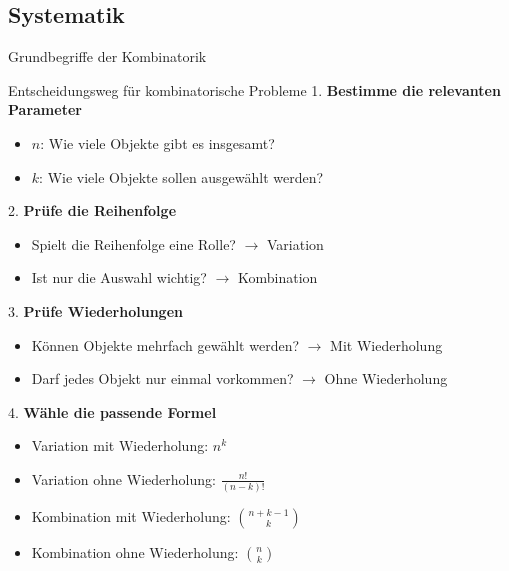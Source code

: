\subsection{Systematik}
\begin{concept}{Grundbegriffe der Kombinatorik}
\begin{center}
\end{center}
\end{concept}

\begin{KR}{Entscheidungsweg für kombinatorische Probleme}
1. \textbf{Bestimme die relevanten Parameter}
   \begin{itemize}
   \item $n$: Wie viele Objekte gibt es insgesamt?
   \item $k$: Wie viele Objekte sollen ausgewählt werden?
   \end{itemize}

2. \textbf{Prüfe die Reihenfolge}
   \begin{itemize}
   \item Spielt die Reihenfolge eine Rolle? $\rightarrow$ Variation
   \item Ist nur die Auswahl wichtig? $\rightarrow$ Kombination
   \end{itemize}

3. \textbf{Prüfe Wiederholungen}
   \begin{itemize}
   \item Können Objekte mehrfach gewählt werden? $\rightarrow$ Mit Wiederholung
   \item Darf jedes Objekt nur einmal vorkommen? $\rightarrow$ Ohne Wiederholung
   \end{itemize}

4. \textbf{Wähle die passende Formel}
   \begin{itemize}
   \item Variation mit Wiederholung: $n^k$
   \item Variation ohne Wiederholung: $\frac{n!}{(n-k)!}$
   \item Kombination mit Wiederholung: $\binom{n+k-1}{k}$
   \item Kombination ohne Wiederholung: $\binom{n}{k}$
   \end{itemize}
\end{KR}

